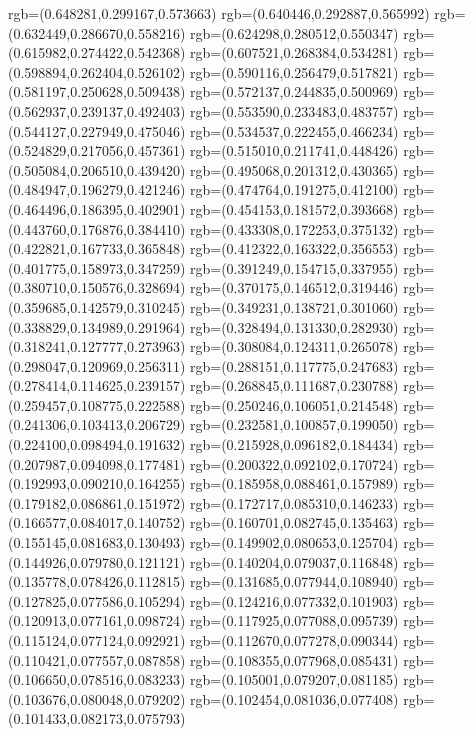 {{{			rgb=(0.648281,0.299167,0.573663)
			rgb=(0.640446,0.292887,0.565992)
			rgb=(0.632449,0.286670,0.558216)
			rgb=(0.624298,0.280512,0.550347)
			rgb=(0.615982,0.274422,0.542368)
			rgb=(0.607521,0.268384,0.534281)
			rgb=(0.598894,0.262404,0.526102)
			rgb=(0.590116,0.256479,0.517821)
			rgb=(0.581197,0.250628,0.509438)
			rgb=(0.572137,0.244835,0.500969)
			rgb=(0.562937,0.239137,0.492403)
			rgb=(0.553590,0.233483,0.483757)
			rgb=(0.544127,0.227949,0.475046)
			rgb=(0.534537,0.222455,0.466234)
			rgb=(0.524829,0.217056,0.457361)
			rgb=(0.515010,0.211741,0.448426)
			rgb=(0.505084,0.206510,0.439420)
			rgb=(0.495068,0.201312,0.430365)
			rgb=(0.484947,0.196279,0.421246)
			rgb=(0.474764,0.191275,0.412100)
			rgb=(0.464496,0.186395,0.402901)
			rgb=(0.454153,0.181572,0.393668)
			rgb=(0.443760,0.176876,0.384410)
			rgb=(0.433308,0.172253,0.375132)
			rgb=(0.422821,0.167733,0.365848)
			rgb=(0.412322,0.163322,0.356553)
			rgb=(0.401775,0.158973,0.347259)
			rgb=(0.391249,0.154715,0.337955)
			rgb=(0.380710,0.150576,0.328694)
			rgb=(0.370175,0.146512,0.319446)
			rgb=(0.359685,0.142579,0.310245)
			rgb=(0.349231,0.138721,0.301060)
			rgb=(0.338829,0.134989,0.291964)
			rgb=(0.328494,0.131330,0.282930)
			rgb=(0.318241,0.127777,0.273963)
			rgb=(0.308084,0.124311,0.265078)
			rgb=(0.298047,0.120969,0.256311)
			rgb=(0.288151,0.117775,0.247683)
			rgb=(0.278414,0.114625,0.239157)
			rgb=(0.268845,0.111687,0.230788)
			rgb=(0.259457,0.108775,0.222588)
			rgb=(0.250246,0.106051,0.214548)
			rgb=(0.241306,0.103413,0.206729)
			rgb=(0.232581,0.100857,0.199050)
			rgb=(0.224100,0.098494,0.191632)
			rgb=(0.215928,0.096182,0.184434)
			rgb=(0.207987,0.094098,0.177481)
			rgb=(0.200322,0.092102,0.170724)
			rgb=(0.192993,0.090210,0.164255)
			rgb=(0.185958,0.088461,0.157989)
			rgb=(0.179182,0.086861,0.151972)
			rgb=(0.172717,0.085310,0.146233)
			rgb=(0.166577,0.084017,0.140752)
			rgb=(0.160701,0.082745,0.135463)
			rgb=(0.155145,0.081683,0.130493)
			rgb=(0.149902,0.080653,0.125704)
			rgb=(0.144926,0.079780,0.121121)
			rgb=(0.140204,0.079037,0.116848)
			rgb=(0.135778,0.078426,0.112815)
			rgb=(0.131685,0.077944,0.108940)
			rgb=(0.127825,0.077586,0.105294)
			rgb=(0.124216,0.077332,0.101903)
			rgb=(0.120913,0.077161,0.098724)
			rgb=(0.117925,0.077088,0.095739)
			rgb=(0.115124,0.077124,0.092921)
			rgb=(0.112670,0.077278,0.090344)
			rgb=(0.110421,0.077557,0.087858)
			rgb=(0.108355,0.077968,0.085431)
			rgb=(0.106650,0.078516,0.083233)
			rgb=(0.105001,0.079207,0.081185)
			rgb=(0.103676,0.080048,0.079202)
			rgb=(0.102454,0.081036,0.077408)
			rgb=(0.101433,0.082173,0.075793)
}}}
